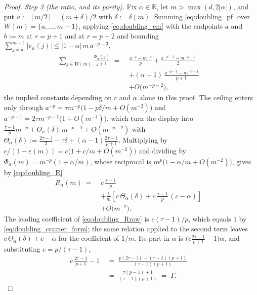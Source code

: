 \begin{proof}
\emph{Step 3 (the ratio, and its parity).} Fix $\alpha\in\mathbb R$, let
$m>\max(d,2|\alpha|)$, and put $a:=\lceil m/2\rceil=(m+\delta)/2$ with $\delta:=\delta(m)$.
Summing \eqref{eq:doubling_pf} over $W(m)=\{a,\dots,m-1\}$, applying \eqref{eq:doubling_em}
with the endpoints $a$ and $b:=m$ at $r=p+1$ and at $r=p+2$ and bounding
$\sum_{j=a}^{m-1}|e_\alpha(j)|\leq|1-\alpha|\,m\,a^{-p-3}$,
\begin{equation}
\begin{aligned}
    \sum_{j\in W(m)}\frac{\Phi_\alpha(j)}{j+1}
    \;=\;&\frac{a^{-p}-m^{-p}}{p}+\frac{a^{-p-1}-m^{-p-1}}{2}\\
    &+(\alpha-1)\,\frac{a^{-p-1}-m^{-p-1}}{p+1}\\
    &+O\bigl(m^{-p-2}\bigr),
\end{aligned}
\end{equation}
the implied constants depending on $c$ and $\alpha$ alone in this proof. The ceiling enters
only through $a^{-p}=\tau m^{-p}\bigl(1-p\delta/m+O(m^{-2})\bigr)$ and
$a^{-p-1}=2\tau m^{-p-1}\bigl(1+O(m^{-1})\bigr)$, which turn the display into
$\frac{\tau-1}{p}m^{-p}+\Theta_\alpha(\delta)\,m^{-p-1}+O(m^{-p-2})$ with
$\Theta_\alpha(\delta):=\frac{2\tau-1}{2}-\tau\delta+(\alpha-1)\frac{2\tau-1}{p+1}$.
Multiplying by $c/(1-\varepsilon(m))=c\bigl(1+c/m+O(m^{-2})\bigr)$ and dividing by
$\Phi_\alpha(m)=m^{-p}(1+\alpha/m)$, whose reciprocal is
$m^{p}\bigl(1-\alpha/m+O(m^{-2})\bigr)$, gives by \eqref{eq:doubling_R}
\begin{equation}\label{eq:doubling_Rraw}
\begin{aligned}
    R_\alpha(m)\;=\;&c\,\frac{\tau-1}{p}\\
    &+\frac{1}{m}\left[c\,\Theta_\alpha(\delta)+c\,\frac{\tau-1}{p}\,(c-\alpha)\right]\\
    &+O\bigl(m^{-2}\bigr) .
\end{aligned}
\end{equation}
The leading coefficient of \eqref{eq:doubling_Rraw} is $c(\tau-1)/p$, which equals $1$ by
\eqref{eq:doubling_cramer_form}; the same relation applied to the second term leaves
$c\,\Theta_\alpha(\delta)+c-\alpha$ for the coefficient of $1/m$. Its part in $\alpha$ is
$\bigl(c\frac{2\tau-1}{p+1}-1\bigr)\alpha$, and substituting $c=p/(\tau-1)$,
\begin{equation}
\begin{aligned}
    c\,\frac{2\tau-1}{p+1}-1
    \;&=\;\frac{p(2\tau-1)-(\tau-1)(p+1)}{(\tau-1)(p+1)}\\
    \;&=\;\frac{\tau(p-1)+1}{(\tau-1)(p+1)}\;=\;\Gamma .

\end{aligned}
\end{equation}
\end{proof}
